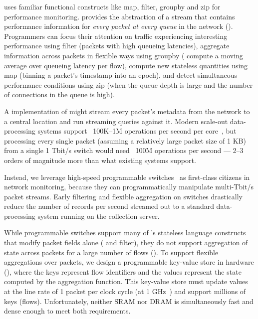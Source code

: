  \TheSystem uses familiar functional
constructs like {\ct map}, {\ct filter}, {\ct groupby} and {\ct zip} for
performance monitoring.
\TheSystem provides the abstraction of a stream that contains performance
information for {\em every packet at every queue} in the network
().
%
Programmers can focus their attention on traffic experiencing interesting
performance using {\ct filter} (\eg packets with high queueing latencies),
aggregate information across packets in flexible ways using {\ct groupby} (\eg
compute a moving average over queueing latency per flow), compute new stateless
quantities using {\ct map} (\eg binning a packet's timestamp into an epoch), and
detect simultaneous performance conditions using {\ct zip} (\eg when the queue
depth is large and the number of connections in the queue is high).

A \naive implementation of \TheSystem might stream every packet's
metadata from the network to a central location and run streaming queries
against it. Modern scale-out data-processing systems support ~100K--1M
operations per second per core~\cite{kafka_benchmark, redis_benchmark,
memcached_benchmark, redis_vs_memcached_update,
spark-streaming}, but processing every single packet (assuming a relatively
large packet size of 1 KB) from a single 1 Tbit/s switch would need ~100M
operations per second --- 2--3 orders of magnitude more than what existing systems
support.

Instead, we leverage high-speed programmable switches~\cite{rmt, xpliant,
tofino, flexpipe} as first-class citizens in network monitoring, because they
can programmatically manipulate multi-Tbit/s packet streams.  Early filtering
and flexible aggregation on switches drastically reduce the number of records per
second streamed out to a standard data-processing system running on
the collection server.

While programmable switches support many of \TheSystem's stateless
language constructs that modify packet fields alone ( and {\ct
filter}), they do not support aggregation of state across packets for a large
number of flows (). To support flexible aggregations over
packets, we design a
programmable key-value store in hardware (), where the keys
represent flow identifiers and the values represent the state computed by the
aggregation function. This key-value store must
update values at the line rate of 1 packet per clock cycle (at 1
GHz~\cite{rmt, xpliant_sdk}) and support millions of keys (\ie flows).
Unfortunately, neither SRAM nor DRAM is simultaneously fast and dense
enough to meet both requirements.

